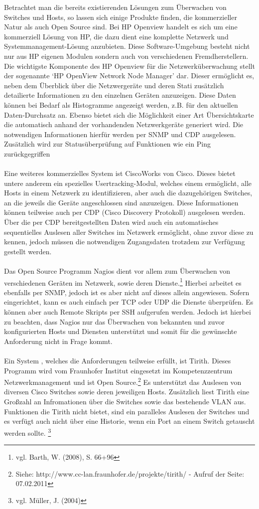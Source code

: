 Betrachtet man die bereits existierenden Lösungen zum Überwachen von Switches und Hosts, so lassen sich einige Produkte finden, die kommerzieller Natur als auch Open Source sind.
Bei HP Openview handelt es sich um eine kommerziell Lösung von HP, die dazu dient eine komplette Netzwerk und Systemmanagement-Lösung anzubieten. Diese Software-Umgebung besteht nicht nur aus HP eigenen Modulen sondern auch von verschiedenen Fremdherstellern.
Die wichtigste Komponente des HP Openview für die Netzwerküberwachung stellt der sogenannte ‘HP OpenView Network Node Manager’ dar.
Dieser ermöglicht es, neben dem Überblick über die Netzwergeräte und deren Stati zusätzlich detailierte Informationen zu den einzelnen Geräten anzuzeigen.
Diese Daten können bei Bedarf als Histogramme angezeigt werden, z.B. für den aktuellen Daten-Durchsatz an.
Ebenso bietet sich die Möglichkeit einer Art Übersichtskarte die automatisch anhand der vorhandenden Netzwerkgeräte generiert wird. Die notwendigen Informationen hierfür werden per SNMP und CDP ausgelesen. Zusätzlich wird zur Statusüberprüfung auf Funktionen wie ein Ping zurückgegriffen\\\\
Eine weiteres kommerzielles System ist CiscoWorks von Cisco. Dieses bietet untere anderem ein spezielles Usertracking-Modul, welches einem ermöglicht, alle Hosts in einem Netzwerk zu identifizieren, aber auch die dazugehörigen Switches, an die jeweils die Geräte angeschlossen sind anzuzeigen. Diese Informationen können teilweise auch per CDP (Cisco Discovery Protokoll) ausgelesen werden.
Über die per CDP bereitgestellten Daten wird auch ein automatisches sequentielles Auslesen aller Switches im Netzwerk ermöglicht, ohne zuvor diese zu kennen, jedoch müssen die notwendigen Zugangsdaten trotzdem zur Verfügung gestellt werden.\\\\
Das Open Source Programm Nagios dient vor allem zum Überwachen von verschiedenen Geräten im Netzwerk, sowie deren Dienste.\footnote{vgl. Barth, W. (2008), S. 66+96}
Hierbei arbeitet es ebenfalls per SNMP, jedoch ist es aber nicht auf dieses allein angewiesen.
Sofern eingerichtet, kann es auch einfach per TCP oder UDP die Dienste überprüfen.
Es können aber auch Remote Skripts per SSH aufgerufen werden.
Jedoch ist hierbei zu beachten, dass Nagios nur das Überwachen von bekannten und zuvor konfigurierten Hosts und Diensten unterstützt und somit für die gewünschte Anforderung nicht in Frage kommt.\\\\
Ein System , welches die Anforderungen teilweise erfüllt, ist Tirith.
Dieses Programm wird vom Fraunhofer Institut eingesetzt im Kompetenzzentrum Netzwerkmanagement und ist Open Source.\footnote{Siehe: http://www.cc-lan.fraunhofer.de/projekte/tirith/ - Aufruf der Seite: 07.02.2011}
Es unterstützt das Auslesen von diversen Cisco Switches sowie deren jeweiligen Hosts.
Zusätzlich liest Tirith eine Großzahl an Infromationen über die Switches sowie das bestehende VLAN aus.
Funktionen die Tirith nicht bietet, sind ein paralleles Auslesen der Switches und es verfügt auch nicht über eine Historie, wenn ein Port an einem Switch getauscht werden sollte.
\footnote{vgl. Müller, J. (2004)}

